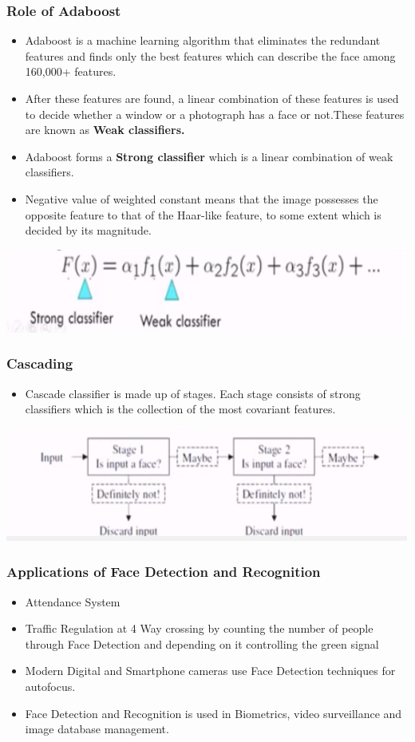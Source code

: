 \documentclass[•]{beamer}
\begin{document}
\begin{frame}
\frametitle{Role of Adaboost}
\begin{itemize}
\item<1->{Adaboost is a machine learning algorithm that eliminates the redundant features and finds only the best features which can describe the face among 160,000+ features.}
\item<2->{After these features are found, a linear combination of these features is used to decide whether a window or a photograph has a face or not.These features are known as \bf Weak classifiers.}
\item<3->{Adaboost forms a {\bf Strong classifier} which is a linear combination of weak classifiers.}
\item<4->{Negative value of weighted constant means that the image possesses the opposite feature to that of the Haar-like feature, to some extent which is decided by its magnitude.}
\end{itemize}
\centering\includegraphics[scale=0.5]{Capture3.PNG}
\end{frame}

\begin{frame}
\frametitle{Cascading}
\begin{itemize}
\item<1->{Cascade classifier is made up of stages. Each stage consists of strong classifiers which is the collection of the most covariant features.}
\end{itemize}
\centering\includegraphics[scale=0.8]{Capture4.PNG}
\end{frame}

\begin{frame}
\frametitle{Applications of Face Detection and Recognition}
\begin{itemize}
\item<1->{Attendance System}
\item<2->{Traffic Regulation at 4 Way crossing by counting the number of people through Face Detection and depending on it controlling the green signal}
\item<3->{Modern Digital and Smartphone cameras use Face Detection techniques for autofocus.}
\item<4->{Face Detection and Recognition is used in Biometrics, video surveillance and image database management.}
\end{itemize}
\end{frame}
\end{document}
